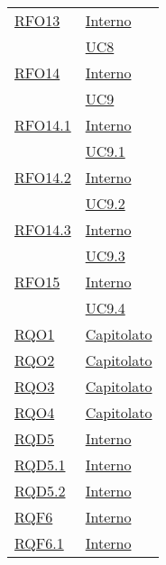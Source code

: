 \begin{longtable}{|>{\centering}m{5cm}|m{5cm}<{\centering}|}
\hyperlink{RFO13}{RFO13} & \hyperlink{Interno}{Interno}\\
& \hyperref[UC8]{UC8}\\ \hline

\hyperlink{RFO14}{RFO14} & \hyperlink{Interno}{Interno}\\
& \hyperref[UC9]{UC9}\\ \hline

\hyperlink{RFO14.1}{RFO14.1} & \hyperlink{Interno}{Interno}\\
& \hyperref[UC9.1]{UC9.1}\\ \hline

\hyperlink{RFO14.2}{RFO14.2} & \hyperlink{Interno}{Interno}\\
& \hyperref[UC9.2]{UC9.2}\\ \hline

\hyperlink{RFO14.3}{RFO14.3} & \hyperlink{Interno}{Interno}\\
& \hyperref[UC9.3]{UC9.3}\\ \hline

\hyperlink{RFO15}{RFO15} & \hyperlink{Interno}{Interno}\\
& \hyperref[UC9.4]{UC9.4}\\ \hline

\hyperlink{RQO1}{RQO1} & \hyperlink{Capitolato}{Capitolato}\\ \hline

\hyperlink{RQO2}{RQO2} & \hyperlink{Capitolato}{Capitolato}\\ \hline

\hyperlink{RQO3}{RQO3} & \hyperlink{Capitolato}{Capitolato}\\ \hline

\hyperlink{RQO4}{RQO4} & \hyperlink{Capitolato}{Capitolato}\\ \hline

\hyperlink{RQD5}{RQD5} & \hyperlink{Interno}{Interno}\\ \hline

\hyperlink{RQD5.1}{RQD5.1} & \hyperlink{Interno}{Interno}\\ \hline

\hyperlink{RQD5.2}{RQD5.2} & \hyperlink{Interno}{Interno}\\ \hline

\hyperlink{RQF6}{RQF6} & \hyperlink{Interno}{Interno}\\ \hline

\hyperlink{RQF6.1}{RQF6.1} & \hyperlink{Interno}{Interno}\\ \hline


\end{longtable}
